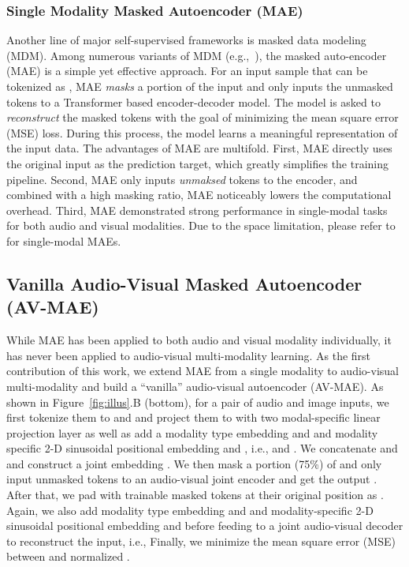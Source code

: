 \documentclass{article} \usepackage{iclr2023_conference,times}
\begin{document}
\subsubsection{Single Modality Masked Autoencoder (MAE)}

Another line of major self-supervised frameworks is masked data modeling (MDM). Among numerous variants of MDM (e.g.,~\cite{bao2021beit,wei2022masked}), the masked auto-encoder (MAE) is a simple yet effective approach. For an input sample  that can be tokenized as , MAE \emph{masks} a portion of the input  and only inputs the unmasked tokens  to a Transformer based encoder-decoder model. The model is asked to \emph{reconstruct} the masked tokens with the goal of minimizing the mean square error (MSE) loss. During this process, the model learns a meaningful representation of the input data. The advantages of MAE are multifold. First, MAE directly uses the original input as the prediction target, which greatly simplifies the training pipeline. Second, MAE only inputs \emph{unmaksed} tokens to the encoder, and combined with a high masking ratio, MAE noticeably lowers the computational overhead. Third, MAE demonstrated strong performance in single-modal tasks for both audio and visual modalities. Due to the space limitation, please refer to~\cite{he2022masked,xu2022masked} for single-modal MAEs.

\subsection{Vanilla Audio-Visual Masked Autoencoder (AV-MAE)}
\label{sec:avmae}
While MAE has been applied to both audio and visual modality individually, it has never been applied to audio-visual multi-modality learning. As the first contribution of this work, we extend MAE from a single modality to audio-visual multi-modality and build a ``vanilla'' audio-visual autoencoder (AV-MAE). As shown in Figure~\ref{fig:illus}.B (bottom), for a pair of audio and image inputs, we first tokenize them to   and  and project them to  with two modal-specific linear projection layer as well as add a modality type embedding  and  and modality specific 2-D sinusoidal positional embedding  and , i.e.,  and . We concatenate  and  and construct a joint embedding . We then mask a portion (75\%) of  and only input unmasked tokens  to an audio-visual joint encoder  and get the output . After that, we pad  with trainable masked tokens at their original position as . Again, we also add modality type embedding  and  and modality-specific 2-D sinusoidal positional embedding  and  before feeding  to a joint audio-visual decoder  to reconstruct the input, i.e., 
Finally, we minimize the mean square error (MSE) between  and normalized . 
\end{document}
